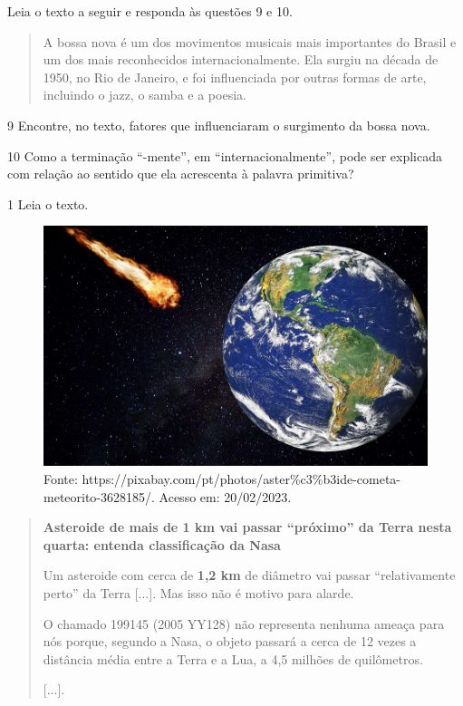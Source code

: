 
Leia o texto a seguir e responda às questões 9 e 10.

\begin{quote}
A bossa nova é um dos movimentos musicais mais importantes do Brasil e
um dos mais reconhecidos internacionalmente. Ela surgiu na década de
1950, no Rio de Janeiro, e foi influenciada por outras formas de arte,
incluindo o jazz, o samba e a poesia.
\end{quote}

\num{9} Encontre, no texto, fatores que influenciaram o surgimento da bossa nova.



\num{10} Como a terminação ``-mente'', em ``internacionalmente'', pode ser explicada com relação ao sentido que ela acrescenta à palavra primitiva?




\num{1} Leia o texto.

\begin{figure}[htpb!]
\includegraphics[width=.5\textwidth]{./imgs/img3.jpg}
\caption{Fonte: https://pixabay.com/pt/photos/aster\%c3\%b3ide-cometa-meteorito-3628185/. Acesso em: 20/02/2023.}
\end{figure}

\begin{quote}
\textbf{Asteroide de mais de 1 km vai passar ``próximo'' da Terra nesta
quarta: entenda classificação da Nasa}

Um asteroide com cerca de \textbf{1,2 km} de diâmetro vai passar
``relativamente perto'' da Terra {[}...{]}. Mas
isso não é motivo para alarde.

O chamado 199145 (2005 YY128) não representa nenhuma ameaça para nós
porque, segundo a Nasa, o
objeto passará a cerca de 12 vezes a distância média entre a Terra e a
Lua, a 4,5 milhões de quilômetros.

{[}...{]}.

\end{quote}

